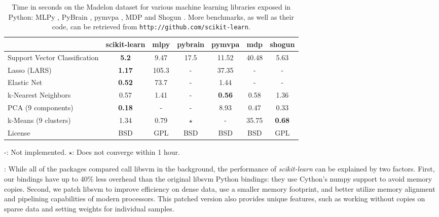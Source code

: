 \documentclass[twoside,11pt]{article}
\begin{document}
\begin{table}[t]
\small
\hspace*{.03\linewidth}%
\begin{tabular}{l c c c c c c}
\hline\hline %
 & scikit-learn & mlpy & pybrain & pymvpa &  mdp & shogun \\ [0.5ex]
\hline
Support Vector Classification & {\bf 5.2} & 9.47 & 17.5 & 11.52 & 40.48 & 5.63 \\
Lasso (LARS) & {\bf 1.17} & 105.3   & - &  37.35 & - & - \\
Elastic Net & {\bf 0.52} & 73.7 & -  &  1.44  & -  & - \\
k-Nearest Neighbors & 0.57 & 1.41 & - &  {\bf 0.56} & 0.58 & 1.36 \\
PCA (9 components) & {\bf 0.18} & - & - & 8.93  & 0.47 & 0.33 \\
k-Means (9 clusters) & 1.34 &  0.79 & $\star$ & -  & 35.75 & {\bf 0.68} \\
License &  BSD & GPL & BSD  &  BSD  & BSD  & GPL \\
\hline
\end{tabular}

-: Not implemented. \hfill
$\star$: Does not converge within 1 hour.

\vspace*{-1.5ex}
\caption{\small
Time in seconds on the Madelon dataset for various machine learning libraries exposed in Python:
MLPy \citep{albanese2008}, PyBrain \citep{schaul2010}, pymvpa
\citep{hanke2009}, MDP \citep{zito2008} and Shogun
\citep{sonnenburg2010}. 
More benchmarks, as well as their code, can be retrieved from {\tt http://github.com/scikit-learn}.
\vspace*{-1.5em}\label{tab:comparisons}
}
\end{table}

\smallskip {}:
%
While all of the packages compared call libsvm in the
background, the
performance of \emph{scikit-learn} can be explained by two factors.
First, our bindings have up to 40\% less overhead than the original
libsvm Python bindings: they use Cython's numpy support
to avoid memory copies. Second, we patch libsvm to improve efficiency
on dense data, use a smaller memory footprint, and better utilize memory
alignment and pipelining capabilities of modern processors. This patched
version also provides unique features, such as working without copies on
sparse data and setting weights for individual samples.
\end{document}
